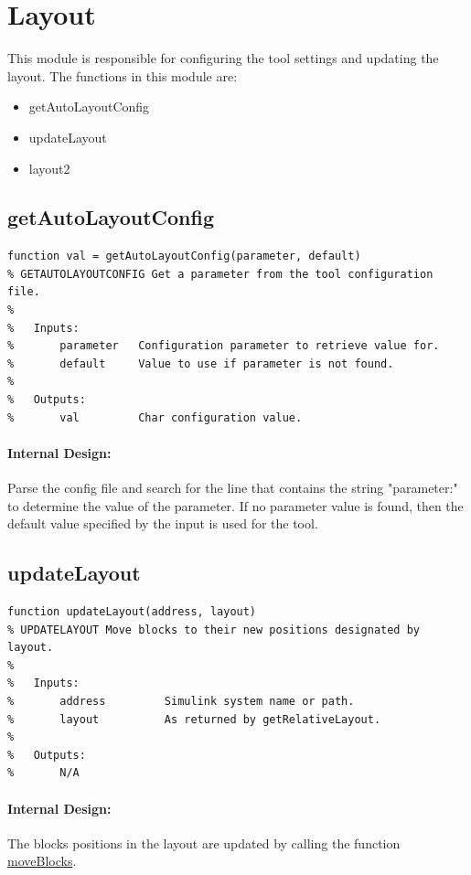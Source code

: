 \documentclass[12pt,letterpaper]{report}
\begin{document}
\section{Layout}
\par This module is responsible for configuring the tool settings and updating the layout. The functions in this module are:
\begin{itemize}
	\item getAutoLayoutConfig
	\item updateLayout
	\item layout2
\end{itemize}
\subsection{getAutoLayoutConfig}
\begin{lstlisting}
function val = getAutoLayoutConfig(parameter, default)
% GETAUTOLAYOUTCONFIG Get a parameter from the tool configuration file.
%
%   Inputs:
%       parameter   Configuration parameter to retrieve value for.
%       default     Value to use if parameter is not found.
%
%   Outputs:
%       val         Char configuration value.
\end{lstlisting}
\paragraph{Internal Design:} Parse the config file and search for the line that contains the string "parameter:" to determine the value of the parameter. If no parameter value is found, then the default value specified by the input is used for the tool.

\subsection{updateLayout}
\begin{lstlisting}
function updateLayout(address, layout)
% UPDATELAYOUT Move blocks to their new positions designated by layout.
%
%   Inputs:
%       address         Simulink system name or path.
%       layout          As returned by getRelativeLayout.
%
%   Outputs:
%       N/A
\end{lstlisting}
\paragraph{Internal Design:} The blocks positions in the layout are updated by calling the function \hyperref[moveBlocks]{moveBlocks}.
\end{document}
